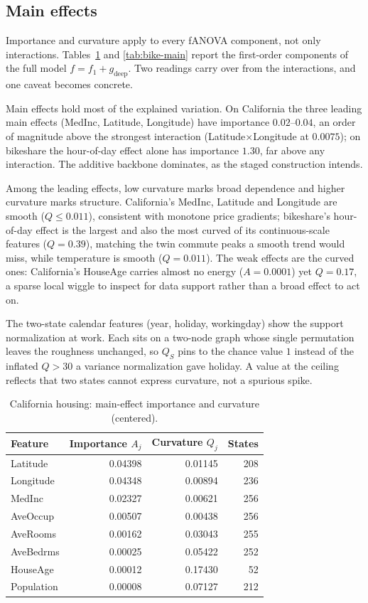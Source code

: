 \documentclass[11pt]{article}
\begin{document}
\subsection{Main effects}

Importance and curvature apply to every fANOVA component, not only interactions.
Tables~\ref{tab:housing-main} and \ref{tab:bike-main} report the first-order
components of the full model $f=f_1+g_{\mathrm{deep}}$. Two readings carry over
from the interactions, and one caveat becomes concrete.

Main effects hold most of the explained variation. On California the three
leading main effects (MedInc, Latitude, Longitude) have importance
$0.02$--$0.04$, an order of magnitude above the strongest interaction
(Latitude$\times$Longitude at $0.0075$); on bikeshare the hour-of-day effect
alone has importance $1.30$, far above any interaction. The additive backbone
dominates, as the staged construction intends.

Among the leading effects, low curvature marks broad dependence and higher
curvature marks structure. California's MedInc, Latitude and Longitude are smooth
($Q\le 0.011$), consistent with monotone price gradients; bikeshare's hour-of-day
effect is the largest and also the most curved of its continuous-scale features
($Q=0.39$), matching the twin commute peaks a smooth trend would miss, while
temperature is smooth ($Q=0.011$). The weak effects are the curved ones:
California's HouseAge carries almost no energy ($A=0.0001$) yet $Q=0.17$, a sparse
local wiggle to inspect for data support rather than a broad effect to act on.

The two-state calendar features (year, holiday, workingday) show the support
normalization at work. Each sits on a two-node graph whose single permutation
leaves the roughness unchanged, so $Q_S$ pins to the chance value $1$ instead of
the inflated $Q>30$ a variance normalization gave holiday. A value at the ceiling
reflects that two states cannot express curvature, not a spurious spike.

\begin{table}[ht]
\centering
\caption{California housing: main-effect importance and curvature (centered).}
\label{tab:housing-main}
\begin{tabular}{lrrr}
\toprule
Feature & Importance $A_j$ & Curvature $Q_j$ & States\\
\midrule
Latitude   & 0.04398 & 0.01145 & 208\\
Longitude  & 0.04348 & 0.00894 & 236\\
MedInc     & 0.02327 & 0.00621 & 256\\
AveOccup   & 0.00507 & 0.00438 & 256\\
AveRooms   & 0.00162 & 0.03043 & 255\\
AveBedrms  & 0.00025 & 0.05422 & 252\\
HouseAge   & 0.00012 & 0.17430 & 52\\
Population & 0.00008 & 0.07127 & 212\\
\bottomrule
\end{tabular}
\end{table}
\end{document}

